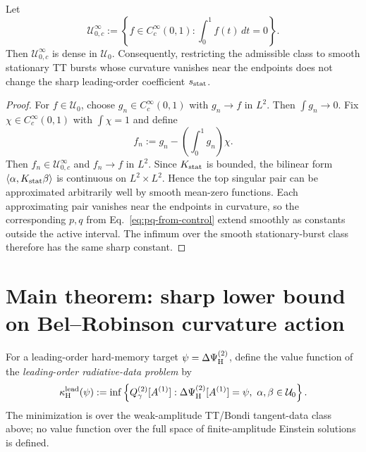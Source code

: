 \begin{lemma}
\label{lem:smooth-density}
Let
\[
\mathcal U_{0,c}^\infty:=\left\{f\in C_c^\infty(0,1):\int_0^1f(t)\,dt=0\right\}.
\]
Then $\mathcal U_{0,c}^\infty$ is dense in $\mathcal U_0$. Consequently, restricting the admissible class to smooth stationary TT bursts whose curvature vanishes near the endpoints does not change the sharp leading-order coefficient $s_{\rm stat}$.
\end{lemma}
\begin{proof}
For $f\in\mathcal U_0$, choose $g_n\in C_c^\infty(0,1)$ with $g_n\to f$ in $L^2$. Then $\int g_n\to0$. Fix $\chi\in C_c^\infty(0,1)$ with $\int\chi=1$ and define
\[
f_n:=g_n-\left(\int_0^1g_n\right)\chi.
\]
Then $f_n\in\mathcal U_{0,c}^\infty$ and $f_n\to f$ in $L^2$. Since $K_{\rm stat}$ is bounded, the bilinear form $\langle\alpha,K_{\rm stat}\beta\rangle$ is continuous on $L^2\times L^2$. Hence the top singular pair can be approximated arbitrarily well by smooth mean-zero functions. Each approximating pair vanishes near the endpoints in curvature, so the corresponding $p,q$ from Eq.~\eqref{eq:pq-from-control} extend smoothly as constants outside the active interval. The infimum over the smooth stationary-burst class therefore has the same sharp constant.
\end{proof}

\section{Main theorem: sharp lower bound on Bel--Robinson curvature action}
For a leading-order hard-memory target $\psi=\Delta\Psi_{\rm H}^{(2)}$, define the value function of the \emph{leading-order radiative-data problem} by
\begin{equation}
\kappa_{\rm H}^{\rm lead}(\psi):=
\inf\left\{Q_\gamma^{(2)}[A^{(1)}]:
\Delta\Psi_{\rm H}^{(2)}[A^{(1)}]=\psi,\ \alpha,\beta\in\mathcal U_0\right\}.
\label{eq:kappa-hard-lead}
\end{equation}
The minimization is over the weak-amplitude TT/Bondi tangent-data class above; no value function over the full space of finite-amplitude Einstein solutions is defined.

